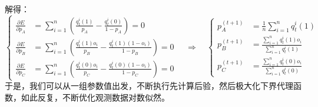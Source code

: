 \documentclass[12pt,a4paper]{article}
\begin{document}
解得：
\begin{equation}
\left\{
\begin{aligned}
\frac{\partial E}{\partial p_A} &= \sum_{i=1}^n \left(\frac{q_t^i(1)}{p_A} - \frac{q_t^i(0)}{1 - p_A} \right) = 0 \\
\frac{\partial E}{\partial p_B} &= \sum_{i=1}^n \left( \frac{q_t^i(1)o_i}{p_B} - \frac{q_t^i(1)(1 - o_i)}{1 - p_B} \right) = 0 \\
\frac{\partial E}{\partial p_C} &= \sum_{i=1}^n \left( \frac{q_t^i(0)o_i}{p_C} - \frac{q_t^i(0)(1 - o_i)}{1 - p_C} \right) = 0
\end{aligned}
\right.
\quad \Rightarrow \quad
\left\{
\begin{aligned}
p_A^{(t+1)} &= \frac{1}{n} \sum_{i=1}^n q_t^i(1) \\
p_B^{(t+1)} &= \frac{\sum_{i=1}^n q_t^i(1)o_i}{\sum_{i=1}^n q_t^i(1)} \\
p_C^{(t+1)} &= \frac{\sum_{i=1}^n q_t^i(0)o_i}{\sum_{i=1}^n q_t^i(0)}
\end{aligned}
\right.
\end{equation}
于是，我们可以从一组参数值出发，不断执行先计算后验，然后极大化下界代理函数，如此反复，不断优化观测数据对数似然。
\end{document}

